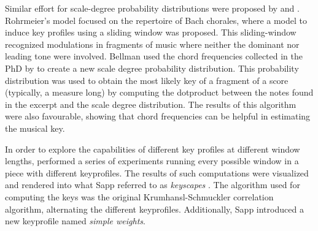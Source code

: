Similar effort for scale-degree probability distributions
were proposed by \textcite{rohrmeier2007modelling} and
\textcite{bellmann2006about}. Rohrmeier's model focused on
the repertoire of Bach chorales, where a model to induce key
profiles using a sliding window was proposed. This
sliding-window recognized modulations in fragments of music
where neither the dominant nor leading tone were involved.
Bellman used the chord frequencies collected in the PhD
\thesisdiss{} by \textcite{budge1943study} to create a new
scale degree probability distribution. This probability
distribution was used to obtain the most likely key of a
fragment of a score (typically, a measure long) by computing
the \gls{dotproduct} between the notes found in the excerpt
and the scale degree distribution. The results of this
algorithm were also favourable, showing that chord
frequencies can be helpful in estimating the musical key.






In order to explore the capabilities of different key
profiles at different window lengths,
\textcite{sapp2011computational} performed a series of
experiments running every possible window in a piece with
different \gls{keyprofile}s. The results of such
computations were visualized and rendered into what Sapp
referred to as \emph{keyscapes}
\parencite{sapp2001harmonic}. The algorithm used for
computing the keys was the original Krumhansl-Schmuckler
correlation algorithm, alternating the different
\gls{keyprofile}s. Additionally, Sapp introduced a new
\gls{keyprofile} named \emph{simple weights}.

